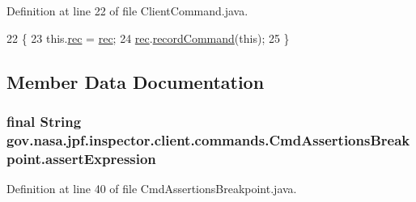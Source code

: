 Definition at line 22 of file Client\+Command.\+java.


\begin{DoxyCode}
22                                                   \{
23     this.\hyperlink{classgov_1_1nasa_1_1jpf_1_1inspector_1_1client_1_1_client_command_af4246f2427035c72a6af45a2c61361f7}{rec} = \hyperlink{classgov_1_1nasa_1_1jpf_1_1inspector_1_1client_1_1_client_command_af4246f2427035c72a6af45a2c61361f7}{rec};
24     \hyperlink{classgov_1_1nasa_1_1jpf_1_1inspector_1_1client_1_1_client_command_af4246f2427035c72a6af45a2c61361f7}{rec}.\hyperlink{classgov_1_1nasa_1_1jpf_1_1inspector_1_1client_1_1_command_recorder_af5f212124179773e46c8b45f1d01a32d}{recordCommand}(\textcolor{keyword}{this});
25   \}
\end{DoxyCode}


\subsection{Member Data Documentation}
\subsubsection[{\texorpdfstring{assert\+Expression}{assertExpression}}]{\setlength{\rightskip}{0pt plus 5cm}final String gov.\+nasa.\+jpf.\+inspector.\+client.\+commands.\+Cmd\+Assertions\+Breakpoint.\+assert\+Expression\hspace{0.3cm}{\ttfamily [private]}}\hypertarget{classgov_1_1nasa_1_1jpf_1_1inspector_1_1client_1_1commands_1_1_cmd_assertions_breakpoint_a895cf2fd0928238c1a8d0e6349b40b91}{}\label{classgov_1_1nasa_1_1jpf_1_1inspector_1_1client_1_1commands_1_1_cmd_assertions_breakpoint_a895cf2fd0928238c1a8d0e6349b40b91}


Definition at line 40 of file Cmd\+Assertions\+Breakpoint.\+java.

